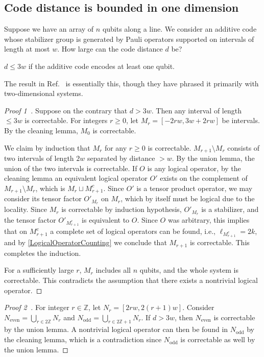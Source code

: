 \subsection{Code distance is bounded in one dimension}
Suppose we have an array of $n$ qubits along a line.
We consider an additive code whose stabilizer group is
generated by Pauli operators supported on intervals of length at most $w$.
How large can the code distance $d$ be?
\begin{thm}
$d \le 3w$ if the additive code encodes at least one qubit.
\label{OneDCodeDistanceBound}
\end{thm}
The result in Ref.~\cite{BravyiTerhal2009no-go} is essentially this,
though they have phrased it primarily with two-dimensional systems.
\begin{proof}[Proof 1~\cite{HaahPreskill2012tradeoff}]
Suppose on the contrary that $d > 3w$.
Then any interval of length $\le 3w$ is correctable.
For integers $r \ge 0$,
let $M_r = [-2r w, 3w+2rw]$ be intervals.
By the cleaning lemma,
$M_0$ is correctable.

We claim by induction that $M_r$ for any $r \ge 0$ is correctable.
$M_{r+1} \setminus M_{r}$ consists of two intervals of length $2w$
separated by distance $>w$.
By the union lemma, the union of the two intervals is correctable.
If $O$ is any logical operator,
by the cleaning lemma an equivalent logical operator $O'$ exists on the complement of 
$M_{r+1} \setminus M_{r}$, which is $M_r \sqcup M_{r+1}^c$.
Since $O'$ is a tensor product operator,
we may consider its tensor factor $O'_{M_r}$ on $M_r$,
which by itself must be logical due to the locality.
Since $M_r$ is correctable by induction hypothesis,
$O'_{M_r}$ is a stabilizer, and the tensor factor $O'_{M_{r+1}^c}$
is equivalent to $O$.
Since $O$ was arbitrary, this implies that on $M_{r+1}^c$
a complete set of logical operators can be found, i.e., $\ell_{M_{r+1}^c} = 2k$,
and by \ref{LogicalOperatorCounting} we conclude that $M_{r+1}$ is correctable.
This completes the induction.

For a sufficiently large $r$, $M_r$ includes all $n$ qubits,
and the whole system is correctable.
This contradicts the assumption that there exists a nontrivial logical operator.
\end{proof}
\begin{proof}[Proof 2~\cite{BravyiTerhal2009no-go}]
For integer $r \in \mathbb Z$, let $N_{r} = [2rw, 2(r+1)w]$.
Consider $N_\text{even} = \bigcup_{r \in 2\mathbb Z} N_r$ and $N_\text{odd} = \bigcup_{r \in 2 \mathbb Z +1} N_r$.
If $d > 3w$, then $N_\text{even}$ is correctable by the union lemma.
A nontrivial logical operator can then be found in $N_\text{odd}$ by the cleaning lemma,
which is a contradiction since $N_\text{odd}$ is correctable as well by the union lemma.
\end{proof}

